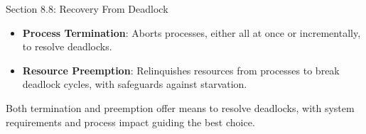 \begin{notes}{Section 8.8: Recovery From Deadlock}
\begin{highlight}
        \begin{itemize}
            \item \textbf{Process Termination}: Aborts processes, either all at once or incrementally, to resolve deadlocks.
            \item \textbf{Resource Preemption}: Relinquishes resources from processes to break deadlock cycles, with safeguards against starvation.
        \end{itemize}
    
    Both termination and preemption offer means to resolve deadlocks, with system requirements and process impact guiding the best choice.
    
    \end{highlight}
\end{notes}
